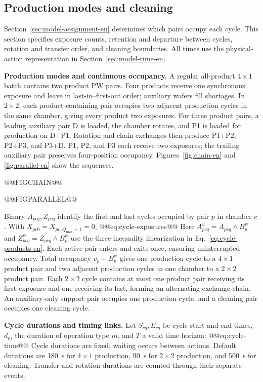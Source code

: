 \subsection{Production modes and cleaning}
\label{sec:model-process-en}

Section~\ref{sec:model-assignment-en} determines which pairs occupy each cycle. This section specifies exposure counts, retention and departure between cycles, rotation and transfer order, and cleaning boundaries. All times use the physical-action representation in Section~\ref{sec:model-time-en}.

\noindent\textbf{Production modes and continuous occupancy.}
A regular all-product $4\times1$ batch contains two product PW pairs. Four products receive one synchronous exposure and leave in last-in--first-out order; auxiliary wafers fill shortages. In $2\times2$, each product-containing pair occupies two adjacent production cycles in the same chamber, giving every product two exposures. For three product pairs, a leading auxiliary pair D is loaded, the chamber rotates, and P1 is loaded for production on D+P1. Rotation and chain exchanges then produce P1+P2, P2+P3, and P3+D. P1, P2, and P3 each receive two exposures; the trailing auxiliary pair preserves four-position occupancy. Figures~\ref{fig:chain-en} and \ref{fig:parallel-en} show the sequences.

@@FIGCHAIN@@

@@FIGPARALLEL@@

Binary $A_{pcq},Z_{pcq}$ identify the first and last cycles occupied by pair $p$ in chamber $c$. With $X_{pc0}=X_{pc,Q_{\max}+1}=0$,
@@eq:cycle-exposures@@
Here $A^{\psi}_{pcq}=A_{pcq}\land B_p^{\psi}$ and $Z^{\psi}_{pcq}=Z_{pcq}\land B_p^{\psi}$ use the three-inequality linearization in Eq.~\eqref{eq:cycle-products-en}. Each active pair enters and exits once, ensuring uninterrupted occupancy. Total occupancy $v_p+B_p^{\psi}$ gives one production cycle to a $4\times1$ product pair and two adjacent production cycles in one chamber to a $2\times2$ product pair. Each $2\times2$ cycle contains at most one product pair receiving its first exposure and one receiving its last, forming an alternating exchange chain. An auxiliary-only support pair occupies one production cycle, and a cleaning pair occupies one cleaning cycle.

\noindent\textbf{Cycle durations and timing links.}
Let $S_{cq},E_{cq}$ be cycle start and end times, $d_m$ the duration of operation type $m$, and $\overline T$ a valid time horizon:
@@eq:cycle-time@@
Cycle durations are fixed; waiting occurs between actions. Default durations are 180~s for $4\times1$ production, 90~s for $2\times2$ production, and 500~s for cleaning. Transfer and rotation durations are counted through their separate events.

